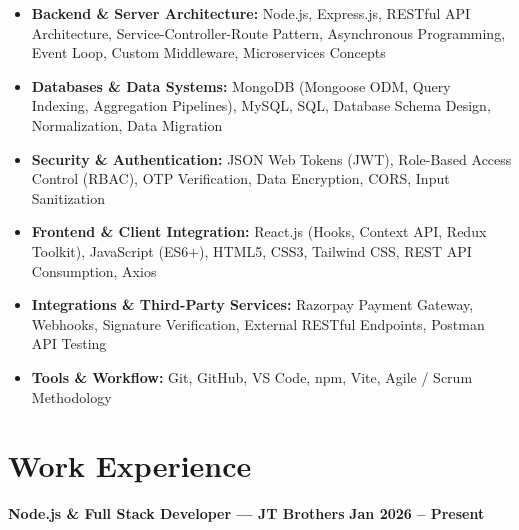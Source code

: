 \documentclass[a4paper,10pt]{article}
\begin{document}
\begin{itemize}

    \item \textbf{Backend \& Server Architecture:}
    Node.js, Express.js, RESTful API Architecture, Service-Controller-Route Pattern,
    Asynchronous Programming, Event Loop, Custom Middleware, Microservices Concepts

    \item \textbf{Databases \& Data Systems:}
    MongoDB (Mongoose ODM, Query Indexing, Aggregation Pipelines),
    MySQL, SQL, Database Schema Design, Normalization, Data Migration

    \item \textbf{Security \& Authentication:}
    JSON Web Tokens (JWT), Role-Based Access Control (RBAC),
    OTP Verification, Data Encryption, CORS, Input Sanitization

    \item \textbf{Frontend \& Client Integration:}
    React.js (Hooks, Context API, Redux Toolkit), JavaScript (ES6+),
    HTML5, CSS3, Tailwind CSS, REST API Consumption, Axios

    \item \textbf{Integrations \& Third-Party Services:}
    Razorpay Payment Gateway, Webhooks, Signature Verification,
    External RESTful Endpoints, Postman API Testing

    \item \textbf{Tools \& Workflow:}
    Git, GitHub, VS Code, npm, Vite, Agile / Scrum Methodology

\end{itemize}

\section*{Work Experience}

\textbf{Node.js \& Full Stack Developer --- JT Brothers}
\hfill
\textbf{Jan 2026 -- Present}
\end{document}
